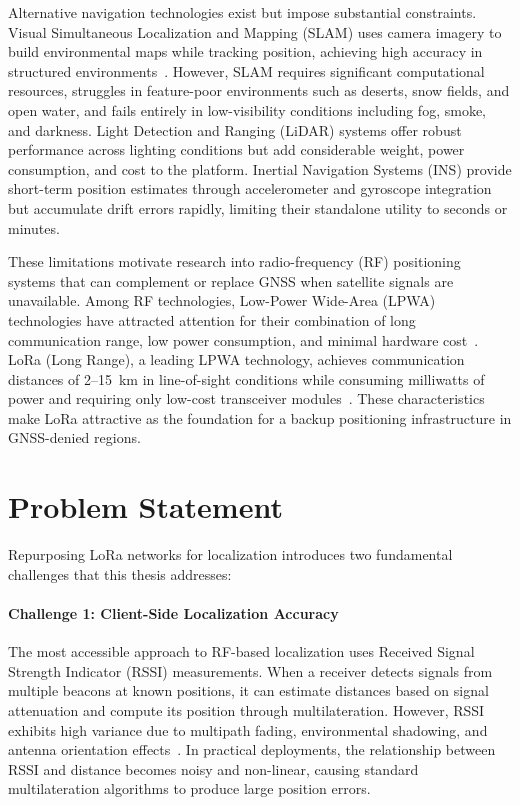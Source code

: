 \documentclass[master,final,11pt]{iscs-thesis}
\begin{document}
Alternative navigation technologies exist but impose substantial constraints.
Visual Simultaneous Localization and Mapping (SLAM) uses camera imagery to build environmental maps while tracking position, achieving high accuracy in structured environments~\cite{ref_slam}.
However, SLAM requires significant computational resources, struggles in feature-poor environments such as deserts, snow fields, and open water, and fails entirely in low-visibility conditions including fog, smoke, and darkness.
Light Detection and Ranging (LiDAR) systems offer robust performance across lighting conditions but add considerable weight, power consumption, and cost to the platform.
Inertial Navigation Systems (INS) provide short-term position estimates through accelerometer and gyroscope integration but accumulate drift errors rapidly, limiting their standalone utility to seconds or minutes.

These limitations motivate research into radio-frequency (RF) positioning systems that can complement or replace GNSS when satellite signals are unavailable.
Among RF technologies, Low-Power Wide-Area (LPWA) technologies have attracted attention for their combination of long communication range, low power consumption, and minimal hardware cost~\cite{ref_lpwan_survey}.
LoRa (Long Range), a leading LPWA technology, achieves communication distances of 2--15~km in line-of-sight conditions while consuming milliwatts of power and requiring only low-cost transceiver modules~\cite{ref_lora_survey}.
These characteristics make LoRa attractive as the foundation for a backup positioning infrastructure in GNSS-denied regions.

\section{Problem Statement}
\label{sec:problem_statement}

Repurposing LoRa networks for localization introduces two fundamental challenges that this thesis addresses:

\paragraph{Challenge 1: Client-Side Localization Accuracy}
The most accessible approach to RF-based localization uses Received Signal Strength Indicator (RSSI) measurements.
When a receiver detects signals from multiple beacons at known positions, it can estimate distances based on signal attenuation and compute its position through multilateration.
However, RSSI exhibits high variance due to multipath fading, environmental shadowing, and antenna orientation effects~\cite{ref_rssi_variance}.
In practical deployments, the relationship between RSSI and distance becomes noisy and non-linear, causing standard multilateration algorithms to produce large position errors.
\end{document}
